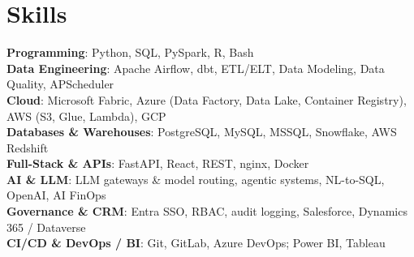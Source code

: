 \documentclass[letterpaper,10pt]{article}
\begin{document}
\section{Skills}
\vspace{1pt}
 \begin{itemize}[leftmargin=0.1in, label={}]
    \small{\item{
     
     

     
    \textbf{Programming}{: Python, SQL, PySpark, R, Bash}\\
\textbf{Data Engineering}{: Apache Airflow, dbt, ETL/ELT, Data Modeling, Data Quality, APScheduler}\\
\textbf{Cloud}{: Microsoft Fabric, Azure (Data Factory, Data Lake, Container Registry), AWS (S3, Glue, Lambda), GCP}\\
\textbf{Databases \& Warehouses}{: PostgreSQL, MySQL, MSSQL, Snowflake, AWS Redshift}\\
\textbf{Full-Stack \& APIs}{: FastAPI, React, REST, nginx, Docker}\\
\textbf{AI \& LLM}{: LLM gateways \& model routing, agentic systems, NL-to-SQL, OpenAI, AI FinOps}\\
\textbf{Governance \& CRM}{: Entra SSO, RBAC, audit logging, Salesforce, Dynamics 365 / Dataverse}\\
\textbf{CI/CD \& DevOps / BI}{: Git, GitLab, Azure DevOps; Power BI, Tableau}\\


     
    }}

 \end{itemize}
 \vspace{-22pt}
\end{document}
